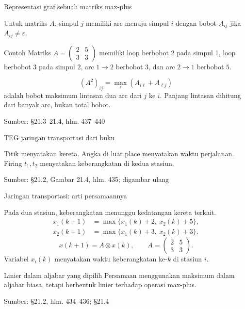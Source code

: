 \documentclass[aspectratio=169,11pt]{beamer}
\newcommand{\source}[1]{%
    \vfill
    \hfill{\tiny\color{gray}Sumber: #1}
}
\newcommand{\eps}{\varepsilon}
\newcommand{\mpmat}[1]{\begin{pmatrix}#1\end{pmatrix}}
\newcommand{\tok}[1]{\fill[AcademicBlue] (#1.center) circle (2.2pt);}
\begin{document}
\begin{frame}{Representasi graf sebuah matriks max-plus}

Untuk matriks $A$, simpul $j$ memiliki arc menuju simpul $i$
dengan bobot $A_{ij}$ jika $A_{ij}\ne\eps$.
\begin{exampleblock}{Contoh}
Matriks $A=\mpmat{2&5\\3&3}$ memiliki loop berbobot $2$ pada simpul 1, loop berbobot $3$ pada simpul 2,
arc $1\to2$ berbobot $3$, dan arc $2\to1$ berbobot $5$.
\end{exampleblock}
\[
(A^2)_{ij}=\max_\ell(A_{i\ell}+A_{\ell j})
\]
adalah bobot maksimum lintasan dua arc dari $j$ ke $i$.
Panjang lintasan dihitung dari banyak arc, bukan total bobot.

\source{\S21.3--21.4, hlm. 437--440}
\end{frame}
\begin{frame}{TEG jaringan transportasi dari buku}

\begin{center}\end{center}
Titik menyatakan kereta. Angka di luar place menyatakan waktu perjalanan.
Firing $t_1,t_2$ menyatakan keberangkatan di kedua stasiun.

\source{\S21.2, Gambar 21.4, hlm. 435; digambar ulang}
\end{frame}
\begin{frame}{Jaringan transportasi: arti persamaannya}


Pada dua stasiun, keberangkatan menunggu kedatangan kereta terkait.
\begin{align*}
x_1(k+1)&=\max\{x_1(k)+2,\ x_2(k)+5\},\\
x_2(k+1)&=\max\{x_1(k)+3,\ x_2(k)+3\}.
\end{align*}
\[
x(k+1)=A\otimes x(k),\qquad A=\mpmat{2&5\\3&3}.
\]
Variabel $x_i(k)$ menyatakan waktu keberangkatan ke-$k$ di stasiun $i$.
\begin{block}{Linier dalam aljabar yang dipilih}
Persamaan menggunakan maksimum dalam aljabar biasa, tetapi berbentuk linier terhadap operasi max-plus.
\end{block}

\source{\S21.2, hlm. 434--436; \S21.4}

\end{frame}
\end{document}
